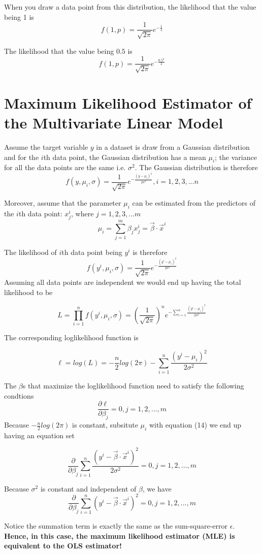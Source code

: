 \documentclass[12pt, oneside]{article}
\begin{document}
When you draw a data point from this distribution, the likelihood that the value being 1 is 
$$f(1, p)=\frac{1}{\sqrt{2\pi}}e^{-\frac{1}{2}}$$

The likelihood that the value being $0.5$ is 
$$f(1, p)=\frac{1}{\sqrt{2\pi}}e^{-\frac{0.5^2}{2}}$$


\section{Maximum Likelihood Estimator of the Multivariate Linear Model}
Assume the target variable $y$ in a dataset is draw from a Gaussian distribution and for the $i$th data point, the Gaussian distribution has a mean $\mu_i$; the variance for all the data points are the same i.e. $\sigma^2$. The Gaussian distribution is therefore
$$f(y, \mu_i, \sigma)=\frac{1}{\sqrt{2\pi}}e^{-\frac{(y-\mu_i)^2}{2\sigma^2}}, i=1, 2, 3, ...n $$

Moreover, assume that the parameter $\mu_i$ can be estimated from the predictors of the $i$th data point: $x_j^i$, where $j=1, 2, 3, ...m$  
\begin{equation}
\mu_i=\sum\limits_{j=1}^{m}\beta_j x_j^i=\vec{\beta}\cdot\vec{x}^i
\end{equation}

The likelihood of $i$th data point being $y^i$ is therefore
$$f(y^i, \mu_i, \sigma)=\frac{1}{\sqrt{2\pi}}e^{-\frac{(y^i-\mu_i)^2}{2\sigma^2}}$$
Assuming all data points are independent we would end up having the total likelihood to be

$$
L=\prod_{i=1}^n f(y^i, \mu_i, \sigma)=(\frac{1}{\sqrt{2\pi}})^n e^{-\sum\limits_{i=1}^n\frac{(y^i-\mu_i)^2}{2\sigma^2}}
$$

The corresponding loglikelihood function is 

$$
\ell=log(L)=-\frac{n}{2}log(2\pi)-\sum\limits_{i=1}^n\frac{(y^i-\mu_i)^2}{2\sigma^2}
$$

The $\beta$s that maximize the loglikelihood function need to satisfy the following condtions
$$
\frac{\partial \ell}{\partial \beta_j}=0, j=1, 2, ..., m
$$
Because $-\frac{n}{2}log(2\pi)$ is constant, subsitute $\mu_i$ with equation (14) we end up having an equation set 

$$\frac{\partial}{\partial \beta_j}\sum\limits_{i=1}^n\frac{(y^i-\vec{\beta}\cdot\vec{x}^i)^2}{2\sigma^2}=0, j=1, 2, ..., m$$

Because $\sigma^2$ is constant and independent of $\beta$, we have 
$$\frac{\partial}{\partial \beta_j}\sum\limits_{i=1}^n {(y^i-\vec{\beta}\cdot\vec{x}^i)^2}=0, j=1, 2, ..., m$$

Notice the summation term is exactly the same as the sum-square-error $\epsilon$. \bf {Hence, in this case, the maximum likelihood estimator (MLE) is equivalent to the OLS estimator!} 
\end{document}
